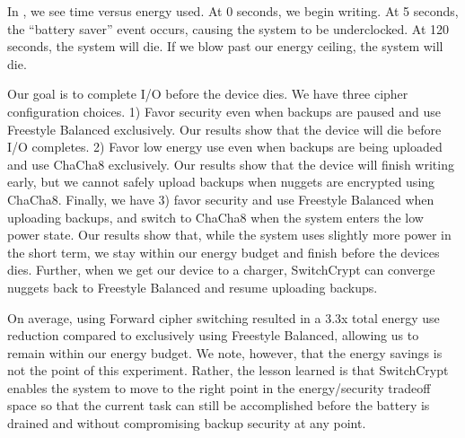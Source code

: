 In , we see time versus energy used. At 0 seconds, we
begin writing. At 5 seconds, the ``battery saver'' event occurs, causing the
system to be underclocked. At 120 seconds, the system will die. If we blow past
our energy ceiling, the system will die.

Our goal is to complete I/O before the device dies. We have three cipher
configuration choices. 1) Favor security even when backups are paused and use
Freestyle Balanced exclusively. Our results show that the device will die before
I/O completes. 2) Favor low energy use even when backups are being uploaded and
use ChaCha8 exclusively. Our results show that the device will finish writing
early, but we cannot safely upload backups when nuggets are encrypted using
ChaCha8. Finally, we have 3) favor security and use Freestyle Balanced when
uploading backups, and switch to ChaCha8 when the system enters the low power
state. Our results show that, while the system uses slightly more power in the
short term, we stay within our energy budget and finish before the devices dies.
Further, when we get our device to a charger, SwitchCrypt can converge nuggets
back to Freestyle Balanced and resume uploading backups.

On average, using Forward cipher switching resulted in a 3.3x total
energy use reduction compared to exclusively using Freestyle Balanced,
allowing us to remain within our energy budget. We note, however, that
the energy savings is not the point of this experiment. Rather, the
lesson learned is that SwitchCrypt enables the system to move to the
right point in the energy/security tradeoff space so that the current
task can still be accomplished before the battery is drained and
without compromising backup security at any point.  

